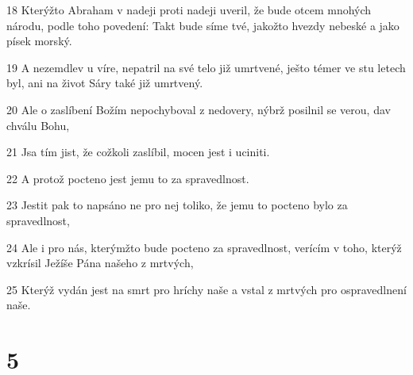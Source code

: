 \par 18 Kterýžto Abraham v nadeji proti nadeji uveril, že bude otcem mnohých národu, podle toho povedení: Takt bude síme tvé, jakožto hvezdy nebeské a jako písek morský.
\par 19 A nezemdlev u víre, nepatril na své telo již umrtvené, ješto témer ve stu letech byl, ani na život Sáry také již umrtvený.
\par 20 Ale o zaslíbení Božím nepochyboval z nedovery, nýbrž posilnil se verou, dav chválu Bohu,
\par 21 Jsa tím jist, že cožkoli zaslíbil, mocen jest i uciniti.
\par 22 A protož pocteno jest jemu to za spravedlnost.
\par 23 Jestit pak to napsáno ne pro nej toliko, že jemu to pocteno bylo za spravedlnost,
\par 24 Ale i pro nás, kterýmžto bude pocteno za spravedlnost, verícím v toho, kterýž vzkrísil Ježíše Pána našeho z mrtvých,
\par 25 Kterýž vydán jest na smrt pro hríchy naše a vstal z mrtvých pro ospravedlnení naše.

\chapter{5}

